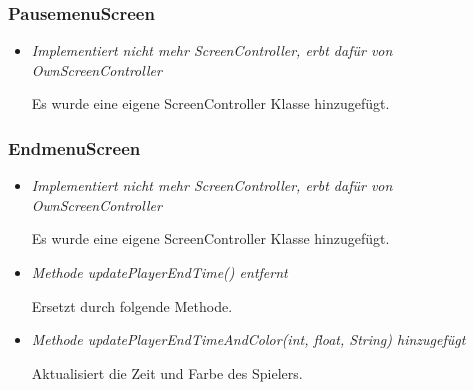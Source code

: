 \subsubsection{PausemenuScreen}
\begin{itemize}
    \item \textit{Implementiert nicht mehr ScreenController, erbt dafür von OwnScreenController}
        \begin{leftbar}[0.9\linewidth]
            Es wurde eine eigene ScreenController Klasse hinzugefügt.
        \end{leftbar}
\end{itemize}

\subsubsection{EndmenuScreen}
\begin{itemize}
    \item \textit{Implementiert nicht mehr ScreenController, erbt dafür von OwnScreenController}
        \begin{leftbar}[0.9\linewidth]
            Es wurde eine eigene ScreenController Klasse hinzugefügt.
        \end{leftbar}
    \item \textit{Methode updatePlayerEndTime() entfernt}
        \begin{leftbar}[0.9\linewidth]
            Ersetzt durch folgende Methode.
        \end{leftbar}
    \item \textit{Methode updatePlayerEndTimeAndColor(int, float, String) hinzugefügt}
        \begin{leftbar}[0.9\linewidth]
            Aktualisiert die Zeit und Farbe des Spielers.
        \end{leftbar}
\end{itemize}